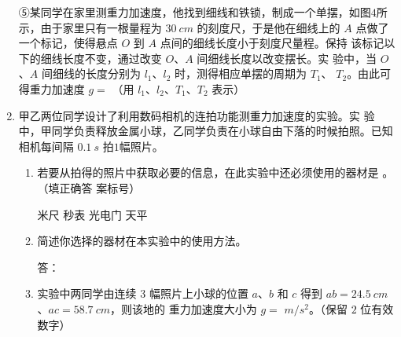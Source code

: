 \begin{enumerate}
⑤某同学在家里测重力加速度，他找到细线和铁锁，制成一个单摆，如图$ 4 $所示，由于家里只有一根量程为 $ 30 \ cm $ 的刻度尺，于是他在细线上的 $ A $
点做了一个标记，使得悬点 $ O $ 到 $ A $ 点间的细线长度小于刻度尺量程。保持
该标记以下的细线长度不变，通过改变 $ O $、$ A $ 间细线长度以改变摆长。实
验中，当 $ O $、$ A $ 间细线的长度分别为 $ l_{1} $、$ l_{2} $ 时，测得相应单摆的周期为 $ T_{1} $、
$ T_{2} $。由此可得重力加速度 $ g= $  （用 $ l_{1} $、$ l_{2} $、$ T_{1} $、$ T_{2} $ 表示）
\begin{figure}[h!]
\centering

\end{figure}


\item 
{}
甲乙两位同学设计了利用数码相机的连拍功能测重力加速度的实验。实
验中，甲同学负责释放金属小球，乙同学负责在小球自由下落的时候拍照。已知相机每间隔 $ 0.1 \ s $ 拍$ 1 $幅照片。
\begin{enumerate}
\renewcommand{\labelenumi}{\arabic{enumi}.}
\item
若要从拍得的照片中获取必要的信息，在此实验中还必须使用的器材是  。
（填正确答
案标号）

\fourchoices
{米尺}
{秒表}
{光电门}
{天平}

\item 
简述你选择的器材在本实验中的使用方法。


答：  



\item 
实验中两同学由连续 $ 3 $ 幅照片上小球的位置 $ a $、$ b $ 和 $ c $ 得到 $ ab=24.5 \ cm $、$ ac=58.7 \ cm $，则该地的
重力加速度大小为 $ g=$  $m/s^{2} $。（保留 $ 2 $ 位有效数字）


\end{enumerate}









\end{enumerate}

